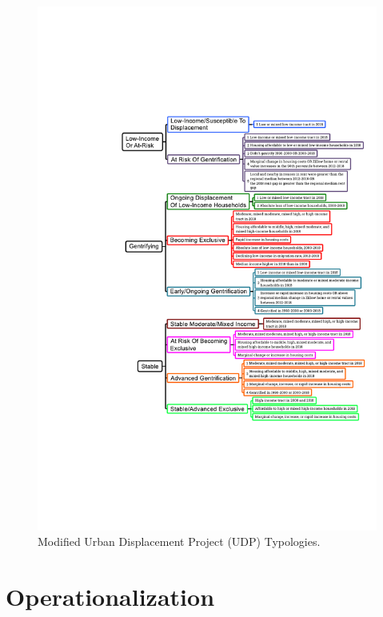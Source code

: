 \documentclass[12pt]{article}
\begin{document}
\begin{figure}[H]
  \centering %
  \includegraphics[width=\linewidth]{images/modified_typologies}
  \captionsetup{justification=centering, singlelinecheck=false, margin=2cm}
  \caption[Modified UDP Displacement Typologies]{Modified Urban Displacement Project (UDP) Typologies.}
  \label{fig:modified_typologies}
\end{figure}

\section{Operationalization}\
\end{document}
